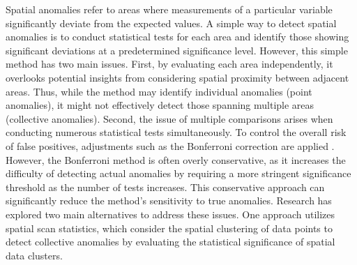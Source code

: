 \documentclass[11pt]{article}
\begin{document}
Spatial anomalies refer to areas where measurements of a particular variable significantly deviate from the expected values. A simple way to detect spatial anomalies is to conduct statistical tests for each area and identify those showing significant deviations at a predetermined significance level. However, this simple method has two main issues. First, by evaluating each area independently, it overlooks potential insights from considering spatial proximity between adjacent areas. Thus, while the method may identify individual anomalies (point anomalies), it might not effectively detect those spanning multiple areas (collective anomalies). Second, the issue of multiple comparisons arises when conducting numerous statistical tests simultaneously. To control the overall risk of false positives, adjustments such as the Bonferroni correction are applied \citep{bland1995multiple}. However, the Bonferroni method is often overly conservative, as it increases the difficulty of detecting actual anomalies by requiring a more stringent significance threshold as the number of tests increases. This conservative approach can significantly reduce the method's sensitivity to true anomalies. Research has explored two main alternatives to address these issues. One approach utilizes spatial scan statistics, which consider the spatial clustering of data points to detect collective anomalies by evaluating the statistical significance of spatial data clusters. 

\end{document}
